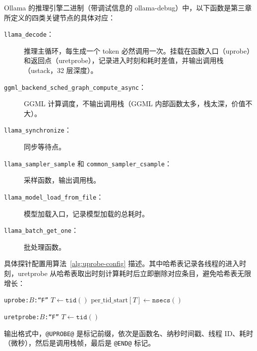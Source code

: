 Ollama 的推理引擎二进制（带调试信息的 ollama-debug）中，以下函数是第三章所定义的四类关键节点的具体对应：

\begin{description}
    \item[\texttt{llama\_decode}：] 推理主循环，每生成一个 token 必然调用一次。挂载在函数入口（uprobe）和返回点（uretprobe），记录进入时刻和耗时差值，并输出调用栈（ustack，32 层深度）。
    \item[\texttt{ggml\_backend\_sched\_graph\_compute\_async}：] GGML 计算调度，不输出调用栈（GGML 内部函数太多，栈太深，价值不大）。
    \item[\texttt{llama\_synchronize}：] 同步等待点。
    \item[\texttt{llama\_sampler\_sample} 和 \texttt{common\_sampler\_csample}：] 采样函数，输出调用栈。
    \item[\texttt{llama\_model\_load\_from\_file}：] 模型加载入口，记录模型加载的总耗时。
    \item[\texttt{llama\_batch\_get\_one}：] 批处理函数。
\end{description}

具体探针配置用算法~\ref{alg:uprobe-config} 描述。其中哈希表记录各线程的进入时刻，uretprobe 从哈希表取出时刻计算耗时后立即删除对应条目，避免哈希表无限增长：

\begin{algorithm}[H]
\caption{uprobe/uretprobe 配置（以 \texttt{llama\_decode} 为例）}
\label{alg:uprobe-config}
\DontPrintSemicolon
{}

\BlankLine
{}
\texttt{uprobe:$B$:“$F$”}
\BlankLine
$T \leftarrow \texttt{tid}()$\;
$\text{per\_tid\_start}[T] \leftarrow \texttt{nsecs}()$

\BlankLine
{}
\texttt{uretprobe:$B$:“$F$”}
\BlankLine
$T \leftarrow \texttt{tid}()$\;
\end{algorithm}

输出格式中，\texttt{@UPROBE@} 是标记前缀，依次是函数名、纳秒时间戳、线程 ID、耗时（微秒），然后是调用栈帧，最后是 \texttt{@END@} 标记。

